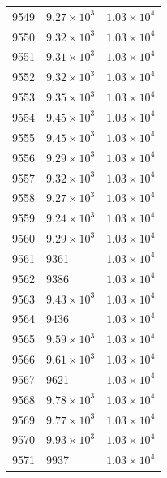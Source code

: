 \begin{table}[H]
\begin{tabular}{lll}
9549 & $\displaystyle 9.27 \times 10^{3}$ & $\displaystyle 1.03 \times 10^{4}$ \\
9550 & $\displaystyle 9.32 \times 10^{3}$ & $\displaystyle 1.03 \times 10^{4}$ \\
9551 & $\displaystyle 9.31 \times 10^{3}$ & $\displaystyle 1.03 \times 10^{4}$ \\
9552 & $\displaystyle 9.32 \times 10^{3}$ & $\displaystyle 1.03 \times 10^{4}$ \\
9553 & $\displaystyle 9.35 \times 10^{3}$ & $\displaystyle 1.03 \times 10^{4}$ \\
9554 & $\displaystyle 9.45 \times 10^{3}$ & $\displaystyle 1.03 \times 10^{4}$ \\
9555 & $\displaystyle 9.45 \times 10^{3}$ & $\displaystyle 1.03 \times 10^{4}$ \\
9556 & $\displaystyle 9.29 \times 10^{3}$ & $\displaystyle 1.03 \times 10^{4}$ \\
9557 & $\displaystyle 9.32 \times 10^{3}$ & $\displaystyle 1.03 \times 10^{4}$ \\
9558 & $\displaystyle 9.27 \times 10^{3}$ & $\displaystyle 1.03 \times 10^{4}$ \\
9559 & $\displaystyle 9.24 \times 10^{3}$ & $\displaystyle 1.03 \times 10^{4}$ \\
9560 & $\displaystyle 9.29 \times 10^{3}$ & $\displaystyle 1.03 \times 10^{4}$ \\
9561 & 9361 & $\displaystyle 1.03 \times 10^{4}$ \\
9562 & 9386 & $\displaystyle 1.03 \times 10^{4}$ \\
9563 & $\displaystyle 9.43 \times 10^{3}$ & $\displaystyle 1.03 \times 10^{4}$ \\
9564 & 9436 & $\displaystyle 1.03 \times 10^{4}$ \\
9565 & $\displaystyle 9.59 \times 10^{3}$ & $\displaystyle 1.03 \times 10^{4}$ \\
9566 & $\displaystyle 9.61 \times 10^{3}$ & $\displaystyle 1.03 \times 10^{4}$ \\
9567 & 9621 & $\displaystyle 1.03 \times 10^{4}$ \\
9568 & $\displaystyle 9.78 \times 10^{3}$ & $\displaystyle 1.03 \times 10^{4}$ \\
9569 & $\displaystyle 9.77 \times 10^{3}$ & $\displaystyle 1.03 \times 10^{4}$ \\
9570 & $\displaystyle 9.93 \times 10^{3}$ & $\displaystyle 1.03 \times 10^{4}$ \\
9571 & 9937 & $\displaystyle 1.03 \times 10^{4}$ \\

\end{tabular}
\end{table}
